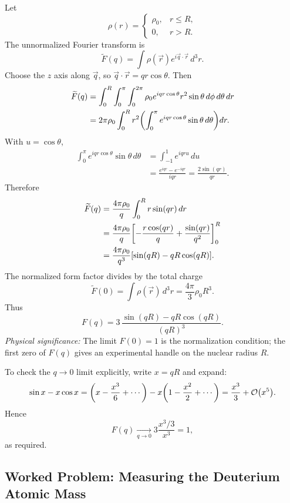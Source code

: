Let
\[
\rho(r)=
\begin{cases}
\rho_0, & r\le R,\\
0, & r>R.
\end{cases}
\]
The unnormalized Fourier transform is
\[
  \widetilde{F}(q)=\int \rho(\vec{r})e^{i\vec{q}\cdot\vec{r}}\,d^3r.
\]
Choose the $z$ axis along $\vec{q}$, so $\vec{q}\cdot\vec{r}=qr\cos\theta$.  Then
\begin{align}
\widetilde{F}(q)
&= \int_0^R \int_0^\pi \int_0^{2\pi}
   \rho_0 e^{iqr\cos\theta} r^2\sin\theta\,d\phi\,d\theta\,dr \nonumber\\
&= 2\pi\rho_0\int_0^R r^2
   \qty(\int_0^\pi e^{iqr\cos\theta}\sin\theta\,d\theta)dr.
\label{eq:lec03:form_factor_setup}
\end{align}
With $u=\cos\theta$,
\begin{align*}
\int_0^\pi e^{iqr\cos\theta}\sin\theta\,d\theta
&=\int_{-1}^{1} e^{iqru}\,du\\
&=\frac{e^{iqr}-e^{-iqr}}{iqr}
=\frac{2\sin(qr)}{qr}.
\end{align*}
Therefore
\begin{align*}
\widetilde{F}(q)
&=\frac{4\pi\rho_0}{q}\int_0^R r\sin(qr)\,dr\\
&=\frac{4\pi\rho_0}{q}
\qty[
-\frac{r\cos(qr)}{q}+\frac{\sin(qr)}{q^2}
]_0^R\\
&=\frac{4\pi\rho_0}{q^3}\qty[\sin(qR)-qR\cos(qR)].
\end{align*}
The normalized form factor divides by the total charge
\[
  \widetilde{F}(0)=\int\rho(\vec{r})\,d^3r
  =\frac{4\pi}{3}\rho_0 R^3.
\]
Thus
\begin{equation}\label{eq:lec03:uniform_sphere_form_factor}
  \boxed{
  F(q)=
  3\,\frac{\sin(qR)-qR\cos(qR)}{(qR)^3}
  }.
\end{equation}
\textit{Physical significance:} The limit $F(0)=1$ is the normalization condition; the first zero of $F(q)$ gives an experimental handle on the nuclear radius $R$.

To check the $q\to0$ limit explicitly, write $x=qR$ and expand:
\[
\sin x - x\cos x
=\qty(x-\frac{x^3}{6}+\cdots)
-x\qty(1-\frac{x^2}{2}+\cdots)
=\frac{x^3}{3}+\order{x^5}.
\]
Hence
\[
  F(q)\xrightarrow[q\to0]{}
  3\frac{x^3/3}{x^3}=1,
\]
as required.

\subsection*{Worked Problem: Measuring the Deuterium Atomic Mass}


